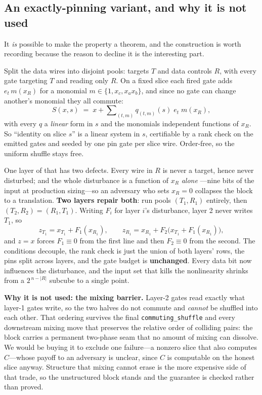 \documentclass[11pt]{article}
\begin{document}
\subsection{An exactly-pinning variant, and why it is not used}

It \emph{is} possible to make the property a theorem, and the construction is
worth recording because the reason to decline it is the interesting part.

Split the data wires into disjoint pools: targets $T$ and data controls $R$,
with every gate targeting $T$ and reading only $R$. On a fixed slice each fired
gate adds $e_t\,m(x_R)$ for a monomial $m \in \{1, x_c, x_a x_b\}$, and since no
gate can change another's monomial they all commute:
\[
S(x,s) \;=\; x + \sum\nolimits_{(t,m)} q_{(t,m)}(s)\; e_t\; m(x_R),
\]
with every $q$ a \emph{linear} form in $s$ and the monomials independent
functions of $x_R$. So ``identity on slice $s$'' is a linear system in $s$,
certifiable by a rank check on the emitted gates and seeded by one pin gate per
slice wire. Order-free, so the uniform shuffle stays free.

One layer of that has two defects. Every wire in $R$ is never a target, hence
never disturbed; and the whole disturbance is a function of $x_R$ \emph{alone}
---nine bits of the input at production sizing---so an adversary who sets
$x_R=0$ collapses the block to a translation. \textbf{Two layers repair both}:
run pools $(T_1,R_1)$ entirely, then $(T_2,R_2)=(R_1,T_1)$. Writing $F_i$ for
layer $i$'s disturbance, layer 2 never writes $T_1$, so
\[
z_{T_1} = x_{T_1} + F_1(x_{R_1}), \qquad
z_{R_1} = x_{R_1} + F_2\bigl(x_{T_1} + F_1(x_{R_1})\bigr),
\]
and $z=x$ forces $F_1 \equiv 0$ from the first line and then $F_2 \equiv 0$ from
the second. The conditions decouple, the rank check is just the union of both
layers' rows, the pins split across layers, and the gate budget is
\textbf{unchanged}. Every data bit now influences the disturbance, and the input
set that kills the nonlinearity shrinks from a $2^{\,n-|R|}$ subcube to a single
point.

\textbf{Why it is not used: the mixing barrier.} Layer-2 gates read exactly what
layer-1 gates write, so the two halves do not commute and \emph{cannot} be
shuffled into each other. That ordering survives the final
\texttt{commuting\_shuffle} and every downstream mixing move that preserves the
relative order of colliding pairs: the block carries a permanent two-phase seam
that no amount of mixing can dissolve. We would be buying it to exclude one
failure---a nonzero slice that also computes $C$---whose payoff to an adversary
is unclear, since $C$ is computable on the honest slice anyway. Structure that
mixing cannot erase is the more expensive side of that trade, so the
unstructured block stands and the guarantee is checked rather than proved.
\end{document}
